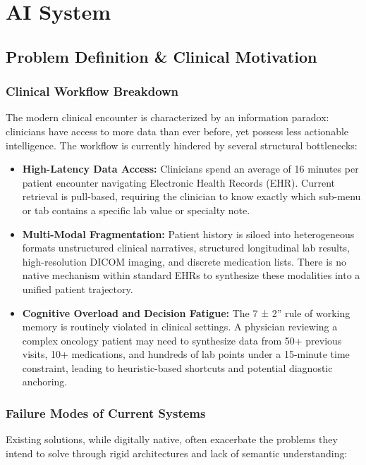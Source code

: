 \chapter{AI System}
\label{chap:AI}

\section{Problem Definition \& Clinical Motivation} 

\subsection{Clinical Workflow Breakdown} The modern clinical encounter is characterized by an information paradox: clinicians have access to more data than ever before, yet possess less actionable intelligence. The workflow is currently hindered by several structural bottlenecks:
\begin{itemize} \item \textbf{High-Latency Data Access:} Clinicians spend an average of 16 minutes per patient encounter navigating Electronic Health Records (EHR). Current retrieval is pull-based, requiring the clinician to know exactly which sub-menu or tab contains a specific lab value or specialty note. \item \textbf{Multi-Modal Fragmentation:} Patient history is siloed into heterogeneous formats unstructured clinical narratives, structured longitudinal lab results, high-resolution DICOM imaging, and discrete medication lists. There is no native mechanism within standard EHRs to synthesize these modalities into a unified patient trajectory. \item \textbf{Cognitive Overload and Decision Fatigue:} The 7 ± 2'' rule of working memory is routinely violated in clinical settings. A physician reviewing a complex oncology patient may need to synthesize data from 50+ previous visits, 10+ medications, and hundreds of lab points under a 15-minute time constraint, leading to heuristic-based shortcuts and potential diagnostic anchoring. \end{itemize}

\subsection{Failure Modes of Current Systems} Existing solutions, while digitally native, often exacerbate the problems they intend to solve through rigid architectures and lack of semantic understanding:

